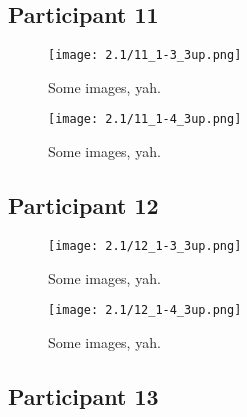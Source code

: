 
\clearpage

\subsection{Participant 11}

\begin{figure}[h]
	\begin{center}
	\texttt{[image: 2.1/11\_1-3\_3up.png]}
	\caption{Some images, yah.}
	\end{center}
\end{figure}

\clearpage

\begin{figure}[h]
	\begin{center}
	\texttt{[image: 2.1/11\_1-4\_3up.png]}
	\caption{Some images, yah.}
	\end{center}
\end{figure}


\clearpage

\subsection{Participant 12}

\begin{figure}[h]
	\begin{center}
	\texttt{[image: 2.1/12\_1-3\_3up.png]}
	\caption{Some images, yah.}
	\end{center}
\end{figure}

\clearpage

\begin{figure}[h]
	\begin{center}
	\texttt{[image: 2.1/12\_1-4\_3up.png]}
	\caption{Some images, yah.}
	\end{center}
\end{figure}


\clearpage

\subsection{Participant 13}

